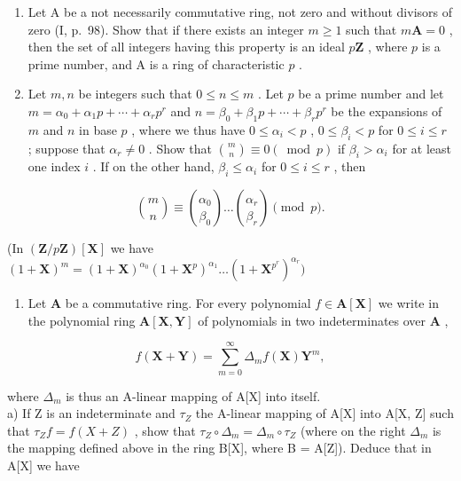 \begin{enumerate}
\def\labelenumi{\arabic{enumi})}
\item
  Let A be a not necessarily commutative ring, not zero and without divisors of zero (I, p.~98). Show that if there exists an integer \(m \geqslant 1\) such that \(m\mathbf{A} = 0\) , then the set of all integers having this property is an ideal \(p\mathbf{Z}\) , where \(p\) is a prime number, and A is a ring of characteristic \(p\) .
\item
  Let \(m, n\) be integers such that \(0 \leqslant n \leqslant m\) . Let \(p\) be a prime number and let \(m = \alpha_0 + \alpha_1p + \cdots + \alpha_rp^r\) and \(n = \beta_0 + \beta_1p + \cdots + \beta_rp^r\) be the expansions of \(m\) and \(n\) in base \(p\) , where we thus have \(0 \leqslant \alpha_i < p\) , \(0 \leqslant \beta_i < p\) for \(0 \leqslant i \leqslant r\) ; suppose that \(\alpha_r \neq 0\) . Show that \(\binom{m}{n} \equiv 0 (\bmod p)\) if \(\beta_i > \alpha_i\) for at least one index \(i\) . If on the other hand, \(\beta_i \leqslant \alpha_i\) for \(0 \leqslant i \leqslant r\) , then
\end{enumerate}

\[
\binom {m} {n} \equiv \binom {\alpha_ {0}} {\beta_ {0}} \dots \binom {\alpha_ {r}} {\beta_ {r}} \pmod {p}  .
\]

(In \((\mathbf{Z} / p\mathbf{Z})[\mathbf{X}]\) we have \((1 + \mathbf{X})^m = (1 + \mathbf{X})^{\alpha_0}(1 + \mathbf{X}^p)^{\alpha_1}\dots (1 + \mathbf{X}^{p^r})^{\alpha_r})\)

\begin{enumerate}
\def\labelenumi{\arabic{enumi})}
\setcounter{enumi}{2}
\tightlist
\item
  Let \(\mathbf{A}\) be a commutative ring. For every polynomial \(f \in \mathbf{A}[\mathbf{X}]\) we write in the polynomial ring \(\mathbf{A}[\mathbf{X}, \mathbf{Y}]\) of polynomials in two indeterminates over \(\mathbf{A}\) ,
\end{enumerate}

\[
f (\mathbf {X} + \mathbf {Y}) = \sum_ {m = 0} ^ {\infty} \Delta_ {m} f (\mathbf {X}) \mathbf {Y} ^ {m},
\]

where \(\Delta_{m}\) is thus an A-linear mapping of A{[}X{]} into itself.\\
a) If Z is an indeterminate and \(\tau_{Z}\) the A-linear mapping of A{[}X{]} into A{[}X, Z{]} such that \(\tau_{Z}f = f(X + Z)\) , show that \(\tau_{Z} \circ \Delta_{m} = \Delta_{m} \circ \tau_{Z}\) (where on the right \(\Delta_{m}\) is the mapping defined above in the ring B{[}X{]}, where B = A{[}Z{]}). Deduce that in A{[}X{]} we have


